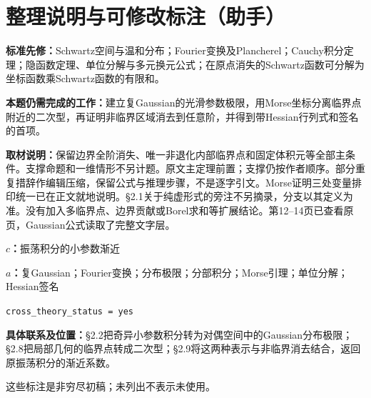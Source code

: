 \documentclass[UTF8,11pt,a4paper]{ctexart}
\theoremstyle{definition}\newtheorem*{definition}{Definition}
\theoremstyle{remark}\newtheorem*{remark}{Remark}
\begin{document}
\section*{整理说明与可修改标注（助手）}
\textbf{标准先修：}Schwartz空间与温和分布；Fourier变换及Plancherel；Cauchy积分定理；隐函数定理、单位分解与多元换元公式；在原点消失的Schwartz函数可分解为坐标函数乘Schwartz函数的有限和。

\textbf{本题仍需完成的工作：}建立复Gaussian的光滑参数极限，用Morse坐标分离临界点附近的二次型，再证明非临界区域消去到任意阶，并得到带Hessian行列式和签名的首项。

\textbf{取材说明：}保留边界全阶消失、唯一非退化内部临界点和固定体积元等全部主条件。支撑命题和一维情形不另计题。原文主定理前置；支撑仍按作者顺序。部分重复措辞作编辑压缩，保留公式与推理步骤，不是逐字引文。Morse证明三处变量排印统一已在正文就地说明。§2.1关于纯虚形式的旁注不另摘录，分支以其定义为准。没有加入多临界点、边界贡献或Borel求和等扩展结论。第12--14页已查看原页，Gaussian公式读取了完整文字层。

\textbf{$c$：}振荡积分的小参数渐近

\textbf{$a$：}复Gaussian；Fourier变换；分布极限；分部积分；Morse引理；单位分解；Hessian签名

\texttt{cross\_theory\_status = yes}

\textbf{具体联系及位置：}§2.2把奇异小参数积分转为对偶空间中的Gaussian分布极限；§2.8把局部几何的临界点转成二次型；§2.9将这两种表示与非临界消去结合，返回原振荡积分的渐近系数。

这些标注是非穷尽初稿；未列出不表示未使用。
\end{document}
